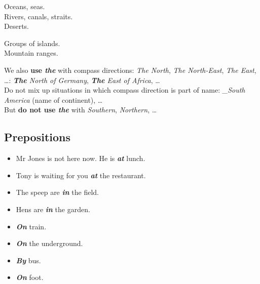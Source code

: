 \documentclass[10pt,a4paper]{article}
\newlength{\OriginalParIndent}
\newcommand\ex[1]{\textit{\textbf{{#1}}}}           %
\newcommand\za{\_\thinspace }                       %
\newenvironment{ItemizeWithOrigParIndent}
    {\begin{itemize}[leftmargin=\OriginalParIndent]}
    {\end{itemize}}
\begin{document}
\hspace{\OriginalParIndent}\begin{minipage}{0.55\linewidth}
Oceans, seas.\\
Rivers, canals, straits.\\
Deserts.
\end{minipage}
\begin{minipage}{0.3\linewidth}
Groups of islands.\\
Mountain ranges.
\end{minipage}\vspace{\parskip}

We also \textbf{use \ex{the}} with compass directions: \textit{The North}, \textit{The North-East}, \textit{The East}, \dots: \textit{\ex{The} North of Germany}, \textit{\ex{The} East of Africa}, \dots\\
Do not mix up situations in which compass direction is part of name:
\textit{\za South America} (name of continent), \dots\\
But \textbf{do not use \ex{the}} with \textit{Southern}, \textit{Northern}, \dots







\subsection{Prepositions}

\begin{ItemizeWithOrigParIndent}
  \item Mr Jones is not here now. He is \ex{at} lunch.
  \item Tony is waiting for you \ex{at} the restaurant.
  \item The speep are \ex{in} the field.
  \item Hens are \ex{in} the garden.
\end{ItemizeWithOrigParIndent}

\begin{ItemizeWithOrigParIndent}
  \item \ex{On} train.
  \item \ex{On} the underground.
  \item \ex{By} bus.
  \item \ex{On} foot.
\end{ItemizeWithOrigParIndent}
\end{document}
